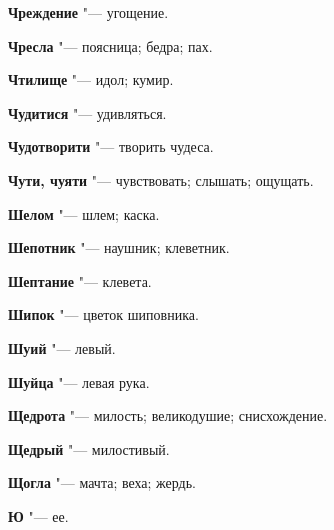 \begin{mymulticols}{2}
\noindent\textbf{Чреждение} "--- угощение. 




\noindent\textbf{Чресла} "--- поясница; бедра; пах. 




\noindent\textbf{Чтилище} "--- идол; кумир. 




\noindent\textbf{Чудитися} "--- удивляться. 




\noindent\textbf{Чудотворити} "--- творить чудеса. 




\noindent\textbf{Чути, чуяти} "--- чувствовать; слышать; ощущать. 




\bukvaending






\noindent\textbf{Шелом} "--- шлем; каска. 




\noindent\textbf{Шепотник} "--- наушник; клеветник. 




\noindent\textbf{Шептание} "--- клевета. 




\noindent\textbf{Шипок} "--- цветок шиповника. 




\noindent\textbf{Шуий} "--- левый. 




\noindent\textbf{Шуйца} "--- левая рука. 




\bukvaending






\noindent\textbf{Щедрота} "--- милость; великодушие; снисхождение. 




\noindent\textbf{Щедрый} "--- милостивый. 




\noindent\textbf{Щогла} "--- мачта; веха; жердь. 




\bukvaending






\noindent\textbf{Ю} "--- ее. 





\end{mymulticols}
